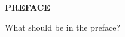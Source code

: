 \begin{center}
{\Large \textbf{PREFACE}}
\end{center}

What should be in the preface?
\tbw


\clearpage
